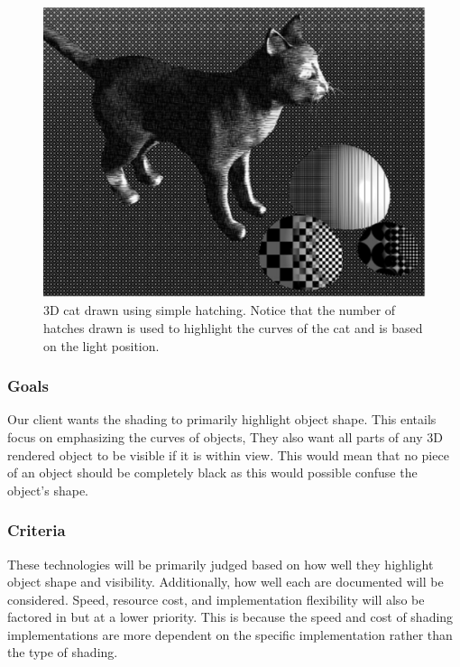\documentclass[10pt,journal,compsoc,draftclsnofoot]{IEEEtran}
\begin{document}
\begin{figure} [H]
  \includegraphics[scale=0.5]{three.eps}
  \caption
{ \newline \hspace{\linewidth}
3D cat drawn using simple hatching. Notice that the number of hatches drawn is used to highlight the curves of the cat and is based on the light position.}
  \label{fig:three}
\end{figure}

\subsubsection{Goals}
Our client wants the shading to primarily highlight object shape. 
This entails focus on emphasizing the curves of objects, 
They also want all parts of any 3D rendered object to be visible if it is within view.
This would mean that no piece of an object should be completely black as this would possible confuse the object's shape.

\subsubsection{Criteria}
These technologies will be primarily judged based on how well they highlight object shape and visibility. 
Additionally, how well each are documented will be considered.
Speed, resource cost, and implementation flexibility will also be factored in but at a lower priority. 
This is because the speed and cost of shading implementations are more dependent on the specific implementation rather than the type of shading.
\end{document}

